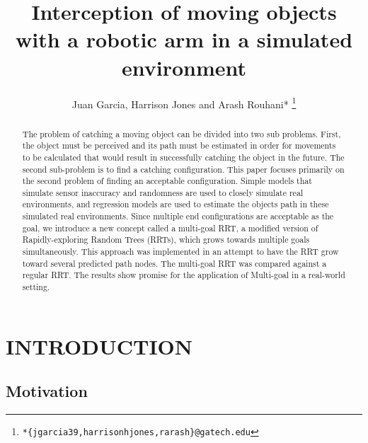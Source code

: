 \documentclass[letterpaper, 10 pt, conference]{ieeeconf}  %
\title{\LARGE \bf
Interception of moving objects with a robotic arm in a simulated environment
}
\author{Juan Garcia, Harrison Jones and Arash Rouhani*
  \thanks{\texttt{*\{jgarcia39,harrisonhjones,rarash\}@gatech.edu}}
}
\begin{document}
\maketitle
\thispagestyle{empty}
\pagestyle{empty}


\begin{abstract}

The problem of catching a moving object can be divided into two sub problems.
First, the object must be perceived and its path must be estimated in order for
movements to be calculated that would result in successfully catching the
object in the future. The second sub-problem is to find a catching
configuration. This paper focuses primarily on the second problem of finding an
acceptable configuration. Simple models that simulate sensor inaccuracy and
randomness are used to closely simulate real environments, and regression
models are used to estimate the objects path in these simulated real
environments. Since multiple end configurations are acceptable as the goal, we
introduce a new concept called a multi-goal RRT, a modified version of
Rapidly-exploring Random Trees (RRTs), which grows towards multiple goals
simultaneously. This approach was implemented in an attempt to have the RRT
grow toward several predicted path nodes. The multi-goal RRT was compared
against a regular RRT. The results show promise for the application of
Multi-goal in a real-world setting.

\end{abstract}

\section{INTRODUCTION}

\subsection{Motivation}
\end{document}
